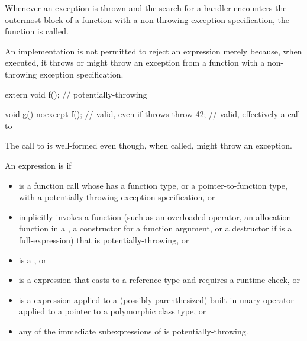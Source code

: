 \pnum
{}%
%
Whenever an exception is thrown
and the search for a handler
encounters the outermost block of a function with a
non-throwing exception specification,
the function  is called.
\begin{note}
An implementation is not permitted to reject an expression merely because, when
executed, it throws or might
throw an exception from a function with a non-throwing exception specification.
\end{note}
\begin{example}
\begin{codeblock}
extern void f();                // potentially-throwing

void g() noexcept {
  f();                          // valid, even if  throws
  throw 42;                     // valid, effectively a call to 
}
\end{codeblock}
The call to
is well-formed even though, when called,
might throw an exception.
\end{example}

\pnum
An expression  is
 if
\begin{itemize}
\item
{} is a function call
whose 
has a function type,
or a pointer-to-function type,
with a potentially-throwing exception specification,
or
\item
{} implicitly invokes a function
(such as an overloaded operator,
an allocation function in a ,
a constructor for a function argument,
or a destructor if  is a full-expression)
that is potentially-throwing,
or
\item
{} is a ,
or
\item
{} is a  expression that casts to a reference type and
requires a runtime check,
or
\item
{} is a  expression applied to a
(possibly parenthesized) built-in unary \tcode{*} operator
applied to a pointer to a
polymorphic class type,
or
\item
any of the immediate subexpressions
of  is potentially-throwing.
\end{itemize}

